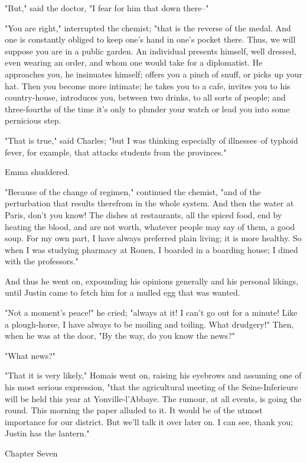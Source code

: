 \documentclass{tufte-book}
\begin{document}
"But," said the doctor, "I fear for him that down there--"

"You are right," interrupted the chemist; "that is the reverse of the
medal. And one is constantly obliged to keep one's hand in one's pocket
there. Thus, we will suppose you are in a public garden. An individual
presents himself, well dressed, even wearing an order, and whom one
would take for a diplomatist. He approaches you, he insinuates himself;
offers you a pinch of snuff, or picks up your hat. Then you become more
intimate; he takes you to a cafe, invites you to his country-house,
introduces you, between two drinks, to all sorts of people; and
three-fourths of the time it's only to plunder your watch or lead you
into some pernicious step.

"That is true," said Charles; "but I was thinking especially of
illnesses--of typhoid fever, for example, that attacks students from the
provinces."

Emma shuddered.

"Because of the change of regimen," continued the chemist, "and of the
perturbation that results therefrom in the whole system. And then the
water at Paris, don't you know! The dishes at restaurants, all the
spiced food, end by heating the blood, and are not worth, whatever
people may say of them, a good soup. For my own part, I have always
preferred plain living; it is more healthy. So when I was studying
pharmacy at Rouen, I boarded in a boarding house; I dined with the
professors."

And thus he went on, expounding his opinions generally and his personal
likings, until Justin came to fetch him for a mulled egg that was
wanted.

"Not a moment's peace!" he cried; "always at it! I can't go out for a
minute! Like a plough-horse, I have always to be moiling and toiling.
What drudgery!" Then, when he was at the door, "By the way, do you know
the news?"

"What news?"

"That it is very likely," Homais went on, raising his eyebrows and
assuming one of his most serious expression, "that the agricultural
meeting of the Seine-Inferieure will be held this year at
Yonville-l'Abbaye. The rumour, at all events, is going the round. This
morning the paper alluded to it. It would be of the utmost importance
for our district. But we'll talk it over later on. I can see, thank you;
Justin has the lantern."



Chapter Seven
\end{document}
